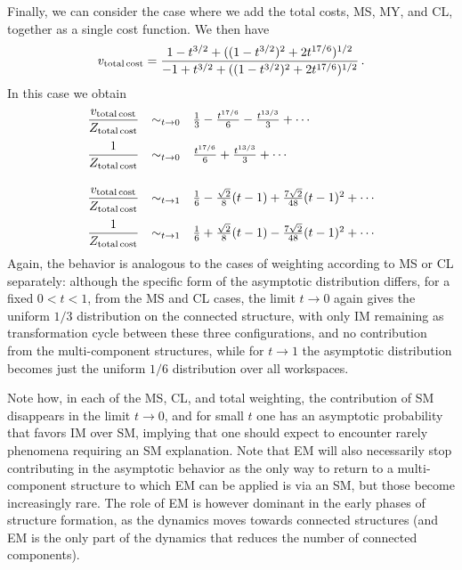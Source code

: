 \documentclass[12pt]{amsart}
\numberwithin{equation}{section}
\begin{document}
Finally, we can consider the case where we add the total costs, MS, MY, and CL, together as a single
cost function. We then have 
\begin{equation}\label{vc}
v_{{\rm total\, cost}}=\frac{1-t^{3/2} + ((1-t^{3/2})^2 + 2 t^{17/6} )^{1/2}}{-1+t^{3/2}  + ((1-t^{3/2})^2 + 2 t^{17/6} )^{1/2}} \, .
\end{equation}
In this case we obtain
\begin{equation}\label{xitot}
\begin{array}{lcl}
\displaystyle{
 \frac{ v_{\rm total\, cost} }{ Z_{\rm total\, cost} } 
 } 
 & \sim_{t\to 0} &     \frac{1}{3}-\frac{t^{17/6}}{6}-\frac{t^{13/3}}{3}       + \cdots    \\[4mm]
\displaystyle{ 
 \frac{1}{ Z_{\rm total\, cost} }  
} 
& \sim_{t\to 0} &    \frac{t^{17/6}}{6} + \frac{t^{13/3}}{3}           + \cdots                        \\[7mm]
\displaystyle{ 
\frac{ v_{\rm total\, cost} }{ Z_{\rm total\, cost} } 
} 
& \sim_{t\to 1} &       \frac{1}{6} - \frac{\sqrt{2}}{8} (t - 1) + \frac{7\sqrt{2}}{48} (t - 1)^2      + \cdots    \\[4mm]
\displaystyle{ 
 \frac{1}{ Z_{\rm total\, cost} } 
 } 
 & \sim_{t\to 1} &    \frac{1}{6} +  \frac{\sqrt{2}}{8} (t - 1) -  \frac{7\sqrt{2}}{48} (t - 1)^2        + \cdots  
\end{array}
\end{equation}
Again, the behavior is analogous to the cases of weighting according to MS or CL separately: although
the specific form of the asymptotic distribution differs, for a fixed $0<t<1$, from the MS and CL cases,
the limit $t\to 0$ again gives the uniform $1/3$ distribution on the connected structure, with only IM
remaining as transformation cycle between these three configurations, and no contribution from
the multi-component structures, while for $t\to 1$ the asymptotic distribution becomes just the
uniform $1/6$ distribution over all workspaces. 

\smallskip

Note how, in each of the MS, CL, and total weighting, the contribution
of SM disappears in the limit $t\to 0$, and for small $t$ one has an asymptotic probability that favors IM
over SM, implying that one should expect to encounter rarely phenomena requiring an SM explanation. 
Note that EM will also necessarily stop contributing in the asymptotic behavior as the only
way to return to a multi-component structure to which EM can be applied is via an SM, but 
those become increasingly rare. The role of EM is however dominant in the early phases 
of structure formation, as the dynamics moves towards connected structures (and EM is the
only part of the dynamics that reduces the number of connected components). 
\end{document}
